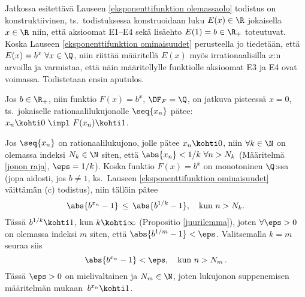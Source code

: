 Jatkossa esitettävä Lauseen \ref{eksponenttifunktion olemassaolo} todistus on
konstruktiivinen, ts.\ todistuksessa konstruoidaan luku $E(x)\in\R$
jokaisella $x\in\R$ niin, että aksioomat E1--E4 sekä lisäehto $E(1)=b\in\R_+$ toteutuvat.
Koska Lauseen \ref{eksponenttifunktion ominaisuudet} perusteella jo tiedetään, että
$E(x)=b^x\ \forall x\in\Q$, niin riittää määritellä $E(x)$ myös irrationaalisilla $x$:n
arvoilla ja varmistaa, että näin määritellylle funktiolle aksioomat E3 ja E4 ovat voimassa.
Todistetaan ensin aputulos.
\begin{Lem} \label{exp-aputulos} Jos $b\in\R_+$, niin funktio $F(x)=b^x$, $\DF_F=\Q$, on
jatkuva pisteessä $x=0$, ts.\ jokaiselle rationaalilukujonolle $\seq{x_n}$ pätee:
$x_n \kohti 0\ \impl\ F(x_n) \kohti 1$.
\end{Lem}
\tod Jos $\seq{x_n}$ on rationaalilukujono, jolle pätee $x_n \kohti 0$, niin
$\forall k\in\N$ on olemassa indeksi $N_k\in\N$ siten, että $\abs{x_n}<1/k\ \forall n>N_k$ 
(Määritelmä \ref{jonon raja}, $\eps=1/k$). Koska funktio $F(x)=b^x$ on monotoninen $\Q$:ssa
(jopa aidosti, jos $b \neq 1$, ks.\ Lauseen \ref{eksponenttifunktion ominaisuudet} väittämän
(c) todistus), niin tällöin pätee
\[
\abs{b^{x_n}-1}\, \le \,\abs{b^{1/k}-1}, \quad \text{kun}\ n>N_k.
\]
Tässä $b^{1/k} \kohti 1$, kun $k \kohti \infty$ (Propositio \ref{juurilemma}), joten
$\forall \eps>0$ on olemassa indeksi $m$ siten, että $\abs{b^{1/m}-1}<\eps$. Valitsemalla
$k=m$ seuraa siis
\[
\abs{b^{x_n}-1} < \eps, \quad \text{kun}\ n>N_m\,.
\]
Tässä $\eps>0$ on mielivaltainen ja $N_m\in\N$, joten lukujonon suppenemisen määritelmän
mukaan $\,b^{x_n} \kohti 1$. \loppu

